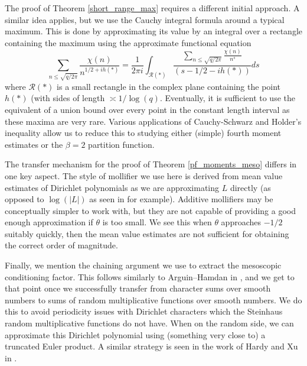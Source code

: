 \documentclass[10pt,a4paper]{amsart}
\numberwithin{equation}{section}
\begin{document}
The proof of Theorem \ref{short_range_max} requires a different initial approach. A similar idea applies, but we use the Cauchy integral formula around a typical maximum. This is done by approximating its value by an integral over a rectangle containing the maximum using the approximate functional equation
$$\sum_{n \leq \sqrt{q/2\pi}}\frac{\chi(n)}{n^{1/2+ih(*)}} = \frac{1}{2\pi i}\int_{\mathcal{R}(*)}\frac{\sum_{n \leq \sqrt{q/2\pi}}\frac{\chi(n)}{n^s}}{(s-1/2-ih(*))}ds$$
where $\mathcal{R}(*)$ is a small rectangle in the complex plane containing the point $h(*)$ (with sides of length $\asymp 1/\log(q)$. Eventually, it is sufficient to use the equivalent of a union bound over every point in the constant length interval as these maxima are very rare. Various applications of Cauchy-Schwarz and Holder's inequality allow us to reduce this to studying either (simple) fourth moment estimates or the $\beta=2$ partition function. \par
The transfer mechanism for the proof of Theorem \ref{pf_moments_meso} differs in one key aspect. The style of mollifier we use here is derived from mean value estimates of Dirichlet polynomials as we are approximating $L$ directly (as opposed to $\log(|L|)$ as seen in \cite{abr20} for example). Additive mollifiers may be conceptually simpler to work with, but they are not capable of providing a good enough approximation if $\theta$ is too small. We see this when $\theta$ approaches $-1/2$ suitably quickly, then the mean value estimates are not sufficient for obtaining the correct order of magnitude. \par 
Finally, we mention the chaining argument we use to extract the mesoscopic conditioning factor. This follows similarly to Arguin--Hamdan in \cite{ah24}, and we get to that point once we successfully transfer from character sums over smooth numbers to sums of random multiplicative functions over smooth numbers. We do this to avoid periodicity issues with Dirichlet characters which the Steinhaus random multiplicative functions do not have. When on the random side, we can approximate this Dirichlet polynomial using (something very close to) a truncated Euler product. A similar strategy is seen in the work of Hardy and Xu in \cite{hx26}.
\end{document}
